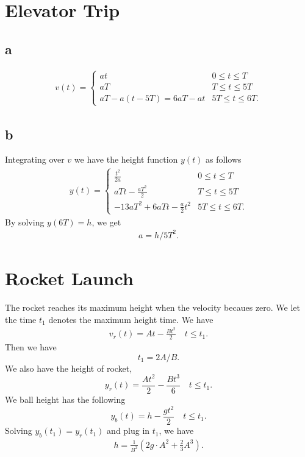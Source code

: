 \documentclass{article}
\begin{document}
\section{Elevator Trip}
\subsection{a}
\begin{align}
  v(t) = \begin{cases}
    at & 0 \leq t \leq T\\
    aT & T\leq t \leq 5T\\
    aT - a (t - 5T) = 6aT - at & 5T \leq t \leq 6T. 
  \end{cases}
\end{align}
\subsection{b}
Integrating over $v$ we have the height function $y(t)$ as follows
\begin{align}
  y(t) = \begin{cases}
    \frac{t^2}{2a} & 0 \leq t \leq T\\
    aTt - \frac{aT^2}{2} & T \leq t \leq 5T\\
    -13aT^2 + 6aTt - \frac{a}{2}t^2 & 5T \leq t \leq 6T.
  \end{cases}
\end{align}
By solving $y(6T) = h$, we get
\begin{align}
  a = h / 5T^2.
\end{align}


\section{Rocket Launch}
The rocket reaches its maximum height when the velocity becaues zero. We let the
time $t_{1}$ denotes the maximum height time. We have
\begin{align}
  v_r(t) = 
    At - \frac{Bt^2}{2} \quad t \leq t_1.
\end{align}
Then we have
\[t_1  = 2A / B.\]
We also have the height of rocket,
\begin{equation}
  y_r(t) = \frac{At^2}{2} - \frac{Bt^3}{6} \quad t \leq t_1.
\end{equation}
We ball height has the following
\begin{equation}
  y_b(t) = h - \frac{gt^2}{2} \quad t \leq t_1.
\end{equation}
Solving $y_b(t_1) = y_r(t_1)$ and plug in $t_1$, we have
\begin{align}
  h = \frac{1}{B^2}\left(2g\cdot A^2 + \frac{2}{3}A^3\right).
\end{align}
\end{document}
